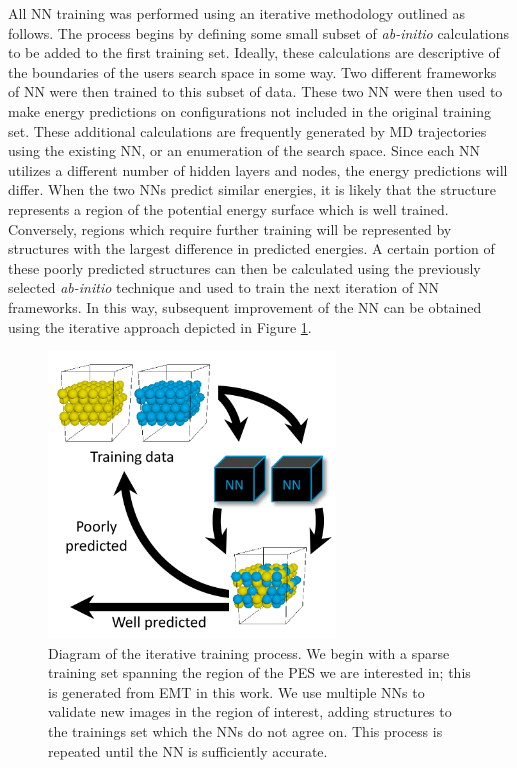\documentclass[12pt]{cmuthesis}
\begin{document}
All NN training was performed using an iterative methodology outlined as follows. The process begins by defining some small subset of \emph{ab-initio} calculations to be added to the first training set. Ideally, these calculations are descriptive of the boundaries of the users search space in some way. Two different frameworks of NN were then trained to this subset of data. These two NN were then used to make energy predictions on configurations not included in the original training set. These additional calculations are frequently generated by MD trajectories using the existing NN, or an enumeration of the search space. Since each NN utilizes a different number of hidden layers and nodes, the energy predictions will differ. When the two NNs predict similar energies, it is likely that the structure represents a region of the potential energy surface which is well trained. Conversely, regions which require further training will be represented by structures with the largest difference in predicted energies. A certain portion of these poorly predicted structures can then be calculated using the previously selected \emph{ab-initio} technique and used to train the next iteration of NN frameworks. In this way, subsequent improvement of the NN can be obtained using the iterative approach depicted in Figure \ref{fig-training-process}.

\begin{figure}[h]
\centering
\includegraphics[width=3in]{./images/training-process.png}
\caption{\label{fig-training-process}
Diagram of the iterative training process. We begin with a sparse training set spanning the region of the PES we are interested in; this is generated from EMT in this work. We use multiple NNs to validate new images in the region of interest, adding structures to the trainings set which the NNs do not agree on. This process is repeated until the NN is sufficiently accurate.}
\end{figure}
\end{document}
